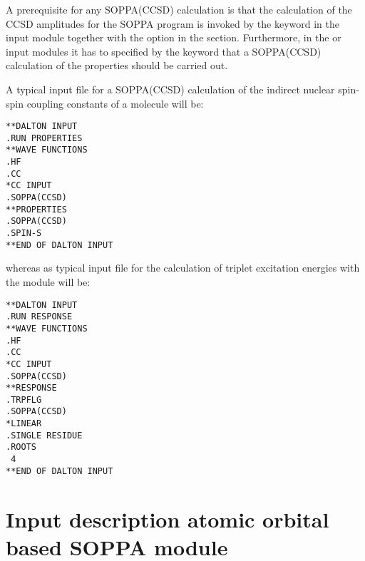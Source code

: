 A prerequisite for any SOPPA(CCSD) calculation is that the calculation of
the CCSD amplitudes for the SOPPA program is invoked by the keyword 
in the  input module together with the 
option in the  section. Furthermore, in the  or
 input modules it has to specified by the keyword 
that a SOPPA(CCSD) calculation of the properties should be carried out.

A typical input file for a SOPPA(CCSD) calculation of the indirect nuclear
spin-spin coupling constants of a molecule will be:

\begin{verbatim}
**DALTON INPUT
.RUN PROPERTIES
**WAVE FUNCTIONS
.HF
.CC
*CC INPUT
.SOPPA(CCSD)
**PROPERTIES
.SOPPA(CCSD)
.SPIN-S
**END OF DALTON INPUT
\end{verbatim}
whereas as typical input file for the calculation of triplet
excitation energies with the
 module will be:
\begin{verbatim}
**DALTON INPUT
.RUN RESPONSE
**WAVE FUNCTIONS
.HF
.CC
*CC INPUT
.SOPPA(CCSD)
**RESPONSE
.TRPFLG
.SOPPA(CCSD)
*LINEAR
.SINGLE RESIDUE
.ROOTS
 4
**END OF DALTON INPUT
\end{verbatim}



\section{Input description atomic orbital based SOPPA module}\label{sec:AOsoppa}

\begin{center}
\end{center}

